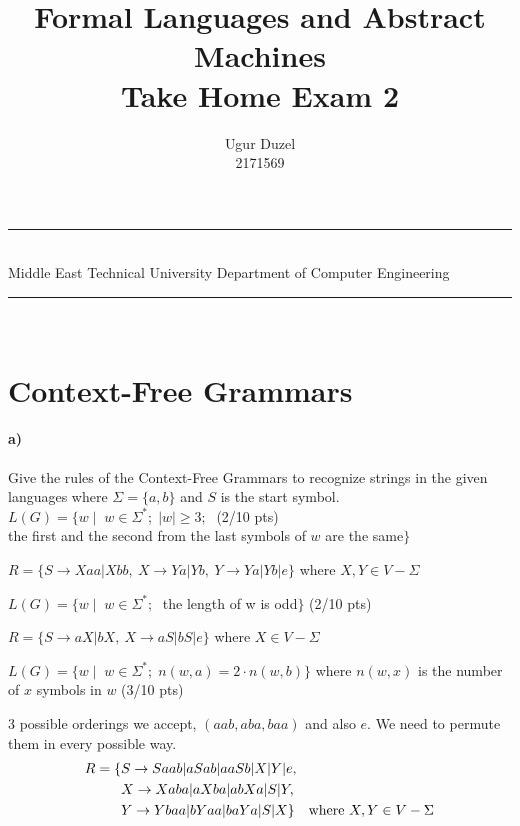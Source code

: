 \documentclass[a4paper,12pt]{article}
\title{Formal Languages and Abstract Machines \\ Take Home Exam 2}
\author{Ugur Duzel \\ 2171569} %
\date{} %
\newcommand{\HRule}{\rule{\linewidth}{1mm}}
\begin{document}
\HRule\\
Middle East Technical University \hfill Department of Computer Engineering
{\let\newpage\relax\maketitle}
\HRule\\
\vspace{1cm}


\section{Context-Free Grammars \hfill {}}

\paragraph{a)} Give the rules of the Context-Free Grammars to recognize strings in the given languages where $\Sigma=\{a,b\}$ and $S$ is the start symbol. \\  

$L(G)=\{w \mid \;  w \in \Sigma^*;\; |w| \geq 3;\; $  \hfill \small{(2/10 pts)} \\
\hspace*{22mm} the first and the second from the last symbols of $w$ are the same$\}$ \\

\begin{tcolorbox}
$R = \{S\rightarrow Xaa|Xbb,\ X\rightarrow Ya|Yb,\ Y\rightarrow Ya|Yb|e\}$ where $X,Y\in V-\Sigma$
\end{tcolorbox}


$L(G)=\{w \mid \;  w \in \Sigma^*;\; $ the length of w is odd$\}$ \hfill \small{(2/10 pts)} \\

\begin{tcolorbox}
$R=\{S\rightarrow aX|bX,\ X\rightarrow aS|bS|e \}$ where $X\in V-\Sigma$
\end{tcolorbox}


$L(G)=\{w \mid \;  w \in \Sigma^*;\; n(w,a)=2\cdot n(w,b)\}$ where $n(w,x)$ is the number of $x$ symbols in $w$ \hfill \small{(3/10 pts)} \\

\begin{tcolorbox}
3 possible orderings we accept, $(aab,aba,baa)$ and also $e$. We need to permute them in every possible way. 
\begin{equation}
\begin{split}
R = \{&S\rightarrow Saab|aSab|aaSb|X|Y|e, \\
	&X\rightarrow Xaba|aXba|abXa|S|Y, \\
	&Y\rightarrow Ybaa|bYaa|baYa|S|X\} \text{\quad where $X,Y\in V-\Sigma$}
\end{split}
\end{equation}


\end{tcolorbox} 
\end{document}

